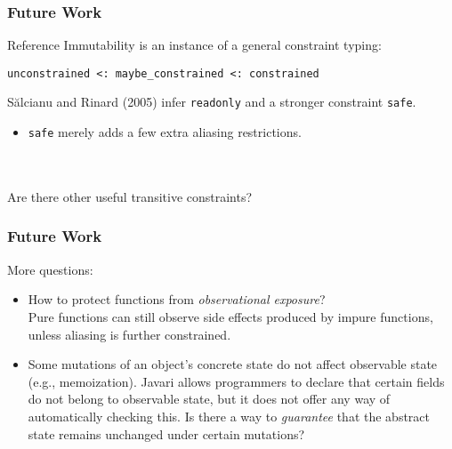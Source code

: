 \documentclass{beamer}
\newcommand{\code}[1]{\lstinline$#1$}
\begin{document}
\begin{frame}
\frametitle{Future Work}
Reference Immutability is an instance of a general constraint typing:
\begin{center}
	\code{unconstrained <: maybe_constrained <: constrained}
\end{center}
Sălcianu and Rinard (2005) infer \code{readonly} and a stronger constraint \code{safe}.
\begin{itemize}
\item \code{safe} merely adds a few extra aliasing restrictions.
\end{itemize}
\hfill\\
\hfill\\
Are there other useful transitive constraints?
\end{frame}

\begin{frame}
\frametitle{Future Work}
More questions:
\begin{itemize}
\item How to protect functions from \emph{observational exposure}?\\
	Pure functions can still observe side effects produced by impure functions,
	unless aliasing is further constrained.
\item Some mutations of an object's concrete state do not affect observable state (e.g., memoization).
	Javari allows programmers to declare that certain fields do not belong to observable state,
	but it does not offer any way of automatically checking this.
	Is there a way to \emph{guarantee} that the abstract state remains unchanged under certain mutations?

\end{itemize}
\end{frame}
\end{document}
